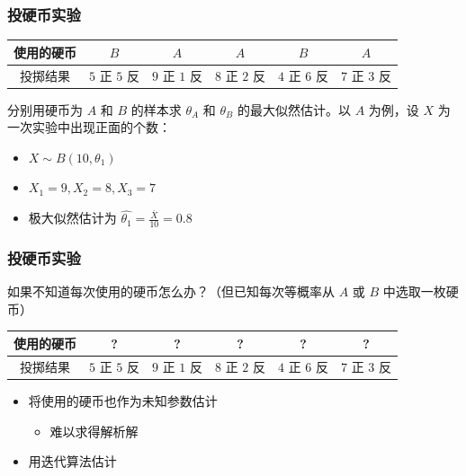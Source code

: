 \documentclass{beamer}
\newcommand{\Gh}{\theta}
\begin{document}
\begin{frame}
    \frametitle{投硬币实验}

    \begin{table}
        \begin{tabular}{c|c|c|c|c|c}
            使用的硬币 & $B$ & $A$ & $A$ & $B$ & $A$ \\\hline
            投掷结果 & $5$ 正 $5$ 反 & $9$ 正 $1$ 反 & $8$ 正 $2$ 反 & $4$ 正 $6$ 反 & $7$ 正 $3$ 反
        \end{tabular}
    \end{table}

    \bigskip

    分别用硬币为 $A$ 和 $B$ 的样本求 $\Gh_A$ 和 $\Gh_B$ 的最大似然估计。以 $A$ 为例，设 $X$ 为一次实验中出现正面的个数：

    \begin{itemize}
        \item $X \sim B(10, \Gh_1)$
        \item $X_1 = 9, X_2 = 8, X_3 = 7$
        \item 极大似然估计为 $\hat{\Gh_1} = \frac{\overline{X}}{10} = 0.8$
    \end{itemize}

\end{frame}

\begin{frame}
    \frametitle{投硬币实验}

    如果不知道每次使用的硬币怎么办？（但已知每次等概率从 $A$ 或 $B$ 中选取一枚硬币）

    \begin{table}
        \begin{tabular}{c|c|c|c|c|c}
            使用的硬币 & ? & ? & ? & ? & ? \\\hline
            投掷结果 & $5$ 正 $5$ 反 & $9$ 正 $1$ 反 & $8$ 正 $2$ 反 & $4$ 正 $6$ 反 & $7$ 正 $3$ 反
        \end{tabular}
    \end{table}

    \begin{itemize}
        \item 将使用的硬币也作为未知参数估计
        \begin{itemize}
            \item 难以求得解析解
        \end{itemize}
        \item 用迭代算法估计
    \end{itemize}

\end{frame}
\end{document}
